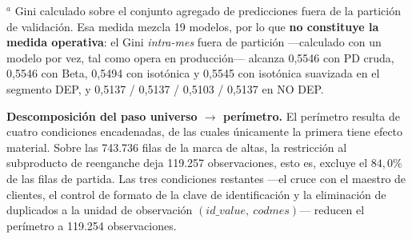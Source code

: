 \documentclass[12pt, a4paper]{article}
\begin{document}
\begin{table}[H]
\centering
\caption{Cascada de filtros --- Comportamental PP Reenganche (base de estimación, corte 202506)}
\label{tab:cascada}
\small
{}
\footnotesize $^{a}$ Gini calculado sobre el conjunto agregado de predicciones fuera de la partición de validación. Esa medida mezcla 19 modelos, por lo que \textbf{no constituye la medida operativa}: el Gini \emph{intra-mes} fuera de partición ---calculado con un modelo por vez, tal como opera en producción--- alcanza 0,5546 con PD cruda, 0,5546 con Beta, 0,5494 con isotónica y 0,5545 con isotónica suavizada en el segmento DEP, y 0,5137 / 0,5137 / 0,5103 / 0,5137 en NO DEP.
\end{table}

\noindent\textbf{Descomposición del paso universo $\to$ perímetro.} El perímetro resulta de cuatro condiciones encadenadas, de las cuales únicamente la primera tiene efecto material. Sobre las 743.736 filas de la marca de altas, la restricción al subproducto de reenganche deja 119.257 observaciones, esto es, excluye el $84{,}0\%$ de las filas de partida. Las tres condiciones restantes ---el cruce con el maestro de clientes, el control de formato de la clave de identificación y la eliminación de duplicados a la unidad de observación $(id\_value,\ codmes)$--- reducen el perímetro a 119.254 observaciones.
\end{document}
